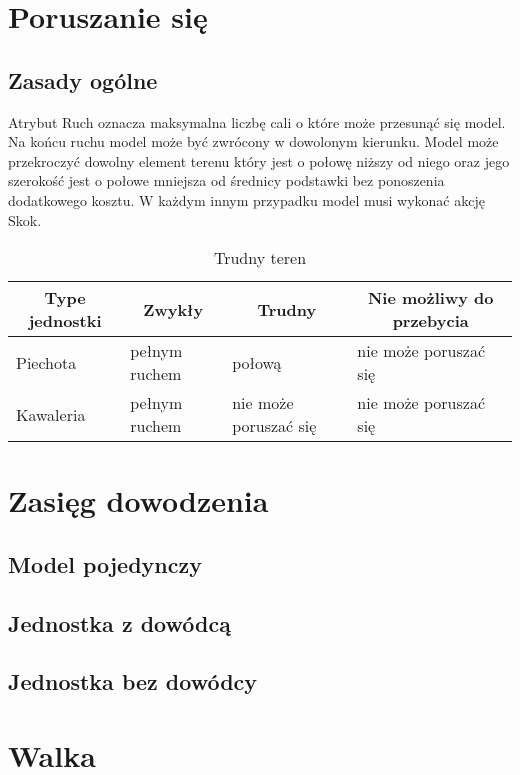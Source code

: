 \section{Poruszanie się}
\subsection{Zasady ogólne}
Atrybut Ruch oznacza maksymalna liczbę cali o które może przesunąć się model. Na końcu ruchu model może być zwrócony w dowolonym kierunku. Model może przekroczyć dowolny element terenu który jest o połowę niższy od niego oraz jego szerokość jest o połowe mniejsza od średnicy podstawki bez ponoszenia dodatkowego kosztu. W każdym innym przypadku model musi wykonać akcję Skok. 

\begin{table}[h]
\caption{Trudny teren}
\begin{tabular}{|l|l|l|l|}
\hline
\multicolumn{1}{c}{Type jednostki} & \multicolumn{1}{c}{Zwykły} & \multicolumn{1}{c}{Trudny} & \multicolumn{1}{c}{Nie możliwy do przebycia} \\ \hline
Piechota & pełnym ruchem & połową & nie może poruszać się \\ \hline
Kawaleria & pełnym ruchem & nie może poruszać się & nie może poruszać się \\ \hline
\end{tabular}

\end{table}

\section{Zasięg dowodzenia}
\subsection{Model pojedynczy}

\subsection{Jednostka z dowódcą}

\subsection{Jednostka bez dowódcy}


\section{Walka}
